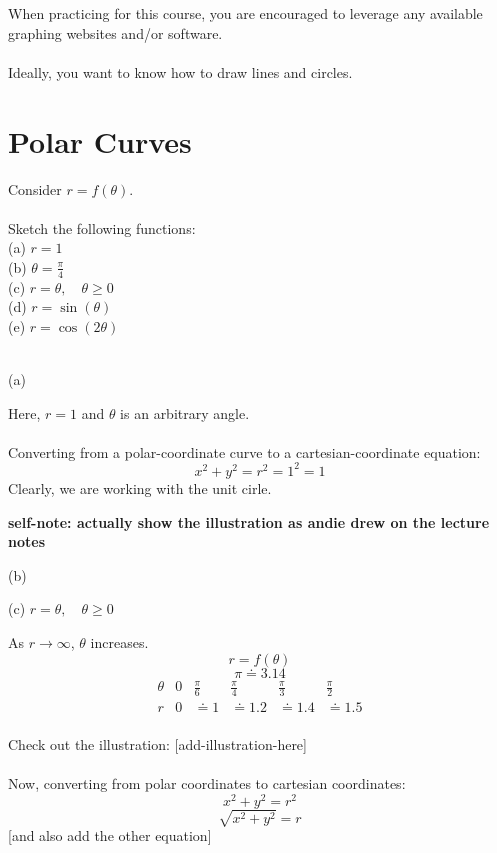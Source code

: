 \documentclass{article}
\begin{document}
\begin{tipbox}
When practicing for this course, you are encouraged to leverage any available graphing websites and/or software. \\
\\
Ideally, you want to know how to draw lines and circles.
\end{tipbox}

\section*{Polar Curves}
\begin{examplebox}
Consider \( r = f(\theta) \). \\
\\
Sketch the following functions: \\
(a) \( r = 1 \) \\
(b) \( \theta = \frac{\pi}{4} \) \\
(c) \( r = \theta, \quad \theta \geq 0 \) \\
(d) \( r = \sin(\theta) \) \\
(e) \( r = \cos(2\theta) \) \\
\\
\end{examplebox}

(a)
\begin{solutionbox}
Here, \( r = 1 \) and \( \theta \) is an arbitrary angle. \\
\\
Converting from a polar-coordinate curve to a cartesian-coordinate equation:
\[
    x^2 + y^2 = r^2 = 1^2 = 1
\]
Clearly, we are working with the unit cirle.

\textbf{self-note: actually show the illustration as andie drew on the lecture notes}
\end{solutionbox}

(b)
\begin{solutionbox}
\end{solutionbox}

(c) \( r = \theta, \quad \theta \geq 0 \)
\begin{solutionbox}
As \( r \to \infty \), \( \theta \) increases.
\[
    r = f(\theta)
\]
\[
    \pi \doteq 3.14
\]
\[
\begin{array}{c|c|c|c|c|c}
\theta & 0 & \frac{\pi}{6} & \frac{\pi}{4} & \frac{\pi}{3} & \frac{\pi}{2} \\
\hline
r & 0 & \doteq 1 & \doteq 1.2 & \doteq 1.4 & \doteq 1.5 \\
\end{array}
\]

Check out the illustration:
[add-illustration-here] \\
\\
Now, converting from polar coordinates to cartesian coordinates:
\[
    x^2 + y^2 = r^2
\]
\[
    \sqrt{x^2 + y^2} = r
\]
[and also add the other equation]
\end{solutionbox}
\end{document}
